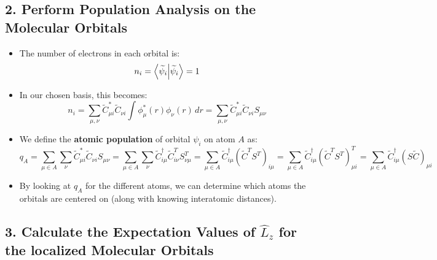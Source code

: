 \documentclass{article}
\begin{document}
\subsection*{2. Perform Population Analysis on the Molecular Orbitals}

\begin{itemize}
    \item The number of electrons in each orbital is:
    \[
    n_i = \braket{\widetilde{\psi}_i} = 1
    \]

    \item In our chosen basis, this becomes:
    \[
    n_i = \sum_{\mu, \nu} \widetilde{C}_{\mu i}^{*} \widetilde{C}_{\nu i} \int \phi_{\mu}^{*}(r) \phi_{\nu}(r) \,dr = \sum_{\mu, \nu} \widetilde{C}_{\mu i}^{*} \widetilde{C}_{\nu i} S_{\mu \nu}
    \]

    \item We define the \textbf{atomic population} of orbital \( \psi_i \) on atom \( A \) as:
    \[
    q_A = \sum_{\mu \in A} \sum_{\nu} \widetilde{C}_{\mu i}^{*} \widetilde{C}_{\nu i} S_{\mu \nu} = \sum_{\mu \in A} \sum_{\nu} \widetilde{C}_{i \mu}^{\dagger} \widetilde{C}_{i \nu}^{T} S_{\nu \mu}^{T} = \sum_{\mu \in A} \widetilde{C}_{i \mu}^{\dagger} (\widetilde{C}^{T} S^{T})_{i \mu} = \sum_{\mu \in A} \widetilde{C}_{i \mu}^{\dagger} (\widetilde{C}^{T} S^{T})_{\mu i}^{T} = \sum_{\mu \in A} \widetilde{C}_{i \mu}^{\dagger} (S \widetilde{C})_{\mu i}
    \]

    \item By looking at \( q_A \) for the different atoms, we can determine which atoms the orbitals are centered on (along with knowing interatomic distances).
\end{itemize}

\subsection*{3. Calculate the Expectation Values of \( \hat{L}_z \) for the localized Molecular Orbitals}
\end{document}

